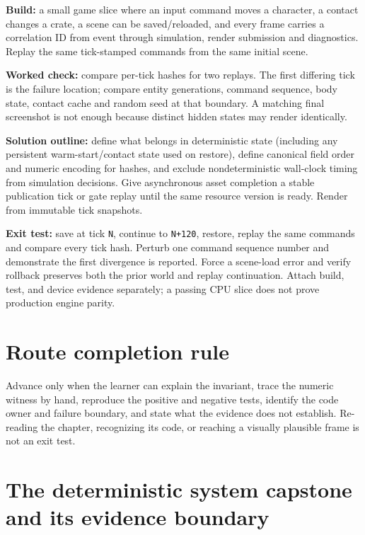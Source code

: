 \textbf{Build:} a small game slice where an input command moves a character, a contact changes a crate, a scene can be saved/reloaded, and every frame carries a correlation ID from event through simulation, render submission and diagnostics. Replay the same tick-stamped commands from the same initial scene.

\textbf{Worked check:} compare per-tick hashes for two replays. The first differing tick is the failure location; compare entity generations, command sequence, body state, contact cache and random seed at that boundary. A matching final screenshot is not enough because distinct hidden states may render identically.

\textbf{Solution outline:} define what belongs in deterministic state (including any persistent warm-start/contact state used on restore), define canonical field order and numeric encoding for hashes, and exclude nondeterministic wall-clock timing from simulation decisions. Give asynchronous asset completion a stable publication tick or gate replay until the same resource version is ready. Render from immutable tick snapshots.

\textbf{Exit test:} save at tick \texttt{N}, continue to \texttt{N+120}, restore, replay the same commands and compare every tick hash. Perturb one command sequence number and demonstrate the first divergence is reported. Force a scene-load error and verify rollback preserves both the prior world and replay continuation. Attach build, test, and device evidence separately; a passing CPU slice does not prove production engine parity.

\section{Route completion rule}\label{06-engine-ii-ch042-route-completion-rule}

Advance only when the learner can explain the invariant, trace the numeric witness by hand, reproduce the positive and negative tests, identify the code owner and failure boundary, and state what the evidence does not establish. Re-reading the chapter, recognizing its code, or reaching a visually plausible frame is not an exit test.

\section{The deterministic system capstone and its evidence boundary}\label{06-engine-ii-ch042-the-deterministic-system-capstone-and-its-evidence-boundary}

